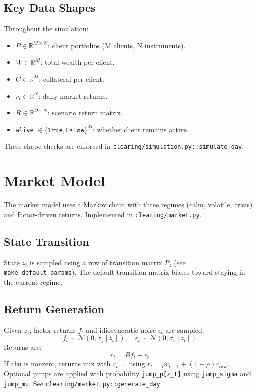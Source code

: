 \documentclass[11pt]{article}
\begin{document}
\subsection{Key Data Shapes}
Throughout the simulation:
\begin{itemize}[leftmargin=*]
  \item $P \in \mathbb{R}^{M \times N}$: client portfolios (M clients, N instruments).
  \item $W \in \mathbb{R}^M$: total wealth per client.
  \item $C \in \mathbb{R}^M$: collateral per client.
  \item $r_t \in \mathbb{R}^N$: daily market returns.
  \item $R \in \mathbb{R}^{\Omega \times N}$: scenario return matrix.
  \item \texttt{alive} $\in \{\texttt{True}, \texttt{False}\}^M$: whether client remains active.
\end{itemize}
These shape checks are enforced in \texttt{clearing/simulation.py::simulate\_day}.

\section{Market Model}
The market model uses a Markov chain with three regimes (calm, volatile, crisis)
and factor-driven returns. Implemented in \texttt{clearing/market.py}.

\subsection{State Transition}
State $z_t$ is sampled using a row of transition matrix $P_z$ (see
\texttt{make\_default\_params}). The default transition matrix biases toward staying in the
current regime.

\subsection{Return Generation}
Given $z_t$, factor returns $f_t$ and idiosyncratic noise $\epsilon_t$ are sampled:
\[
f_t \sim \mathcal{N}(0, \sigma_f[z_t]), \quad
\epsilon_t \sim \mathcal{N}(0, \sigma_e[z_t])
\]
Returns are:
\[
r_t = B f_t + \epsilon_t
\]
If \texttt{rho} is nonzero, returns mix with $r_{t-1}$ using
$r_t = \rho r_{t-1} + (1-\rho) r_{\text{raw}}$.
Optional jumps are applied with probability \texttt{jump\_p[z\_t]} using
\texttt{jump\_sigma} and \texttt{jump\_mu}. See \texttt{clearing/market.py::generate\_day}.
\end{document}
